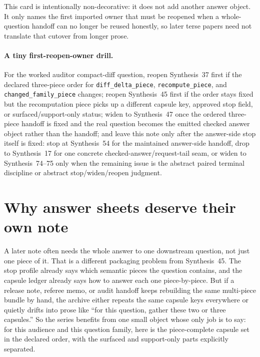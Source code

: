 \documentclass[11pt]{article}
\begin{document}
This card is intentionally non-decorative: it does not add another answer object. It only names the first imported owner that must be reopened when a whole-question handoff can no longer be reused honestly, so later terse papers need not translate that cutover from longer prose.\cite{series:challengeroutes,series:challengestops,series:challengeanswercapsules,series:challengeanswercards,series:challengeanswerreviewmenus,series:pairedterminalcitationdiscipline,series:pairedterminalcutoverrules}

\paragraph{A tiny first-reopen-owner drill.}
For the worked auditor compact-diff question, reopen Synthesis~37 first if the declared three-piece order for \nolinkurl{diff_delta_piece}, \nolinkurl{recompute_piece}, and \nolinkurl{changed_family_piece} changes; reopen Synthesis~45 first if the order stays fixed but the recomputation piece picks up a different capsule key, approved stop field, or surfaced/support-only status; widen to Synthesis~47 once the ordered three-piece handoff is fixed and the real question becomes the emitted checked answer object rather than the handoff; and leave this note only after the answer-side stop itself is fixed: stop at Synthesis~54 for the maintained answer-side handoff, drop to Synthesis~17 for one concrete checked-answer/request-tail seam, or widen to Synthesis~74--75 only when the remaining issue is the abstract paired terminal discipline or abstract stop/widen/reopen judgment.\cite{series:workedexample}

\section{Why answer sheets deserve their own note}
A later note often needs the whole answer to one downstream question, not just one piece of it.
That is a different packaging problem from Synthesis~45.
The stop profile already says which semantic pieces the question contains, and the capsule ledger already says how to answer each one piece-by-piece.
But if a release note, referee memo, or audit handoff keeps rebuilding the same multi-piece bundle by hand, the archive either repeats the same capsule keys everywhere or quietly drifts into prose like ``for this question, gather these two or three capsules.''
So the series benefits from one small object whose only job is to say: for this audience and this question family, here is the piece-complete capsule set in the declared order, with the surfaced and support-only parts explicitly separated.
\end{document}
